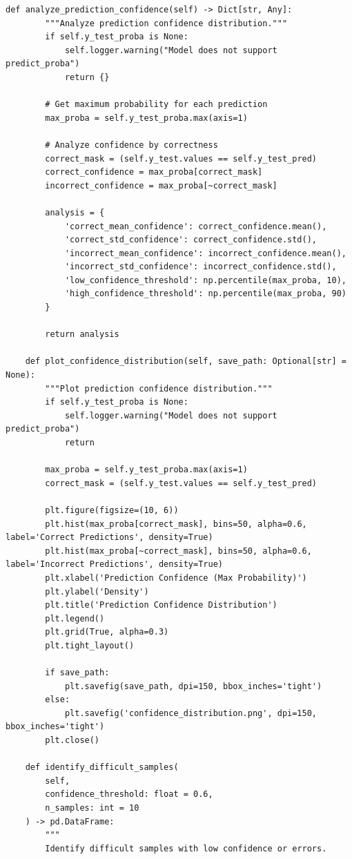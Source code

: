 \begin{lstlisting}[style=python, caption={Comprehensive Model Diagnostic Tools}]
    def analyze_prediction_confidence(self) -> Dict[str, Any]:
        """Analyze prediction confidence distribution."""
        if self.y_test_proba is None:
            self.logger.warning("Model does not support predict_proba")
            return {}

        # Get maximum probability for each prediction
        max_proba = self.y_test_proba.max(axis=1)

        # Analyze confidence by correctness
        correct_mask = (self.y_test.values == self.y_test_pred)
        correct_confidence = max_proba[correct_mask]
        incorrect_confidence = max_proba[~correct_mask]

        analysis = {
            'correct_mean_confidence': correct_confidence.mean(),
            'correct_std_confidence': correct_confidence.std(),
            'incorrect_mean_confidence': incorrect_confidence.mean(),
            'incorrect_std_confidence': incorrect_confidence.std(),
            'low_confidence_threshold': np.percentile(max_proba, 10),
            'high_confidence_threshold': np.percentile(max_proba, 90)
        }

        return analysis

    def plot_confidence_distribution(self, save_path: Optional[str] = None):
        """Plot prediction confidence distribution."""
        if self.y_test_proba is None:
            self.logger.warning("Model does not support predict_proba")
            return

        max_proba = self.y_test_proba.max(axis=1)
        correct_mask = (self.y_test.values == self.y_test_pred)

        plt.figure(figsize=(10, 6))
        plt.hist(max_proba[correct_mask], bins=50, alpha=0.6, label='Correct Predictions', density=True)
        plt.hist(max_proba[~correct_mask], bins=50, alpha=0.6, label='Incorrect Predictions', density=True)
        plt.xlabel('Prediction Confidence (Max Probability)')
        plt.ylabel('Density')
        plt.title('Prediction Confidence Distribution')
        plt.legend()
        plt.grid(True, alpha=0.3)
        plt.tight_layout()

        if save_path:
            plt.savefig(save_path, dpi=150, bbox_inches='tight')
        else:
            plt.savefig('confidence_distribution.png', dpi=150, bbox_inches='tight')
        plt.close()

    def identify_difficult_samples(
        self,
        confidence_threshold: float = 0.6,
        n_samples: int = 10
    ) -> pd.DataFrame:
        """
        Identify difficult samples with low confidence or errors.


\end{lstlisting}

